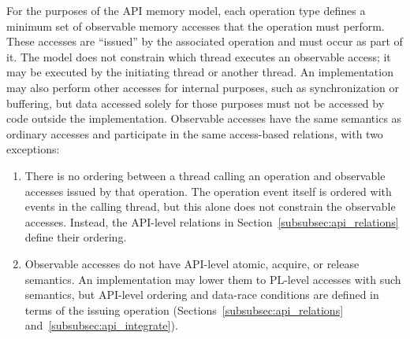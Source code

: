 For the purposes of the API memory model, each \openshmem operation type defines a
    minimum set of observable memory accesses that the operation must perform. These
    accesses are ``issued'' by the associated operation and must occur as part of it.
    The model does not constrain which thread executes an observable access; it may be
    executed by the initiating thread or another thread. An implementation may also
    perform other accesses for internal purposes, such as synchronization or buffering,
    but data accessed solely for those purposes must not be accessed by code outside the
    implementation.
Observable accesses have the same semantics as ordinary accesses and participate in the
    same access-based relations, with two exceptions:
\begin{enumerate}
  \item There is no \relSB{} ordering between a thread calling an \openshmem operation
      and observable accesses issued by that operation. The operation event itself is
      \relSB{} ordered with events in the calling thread, but this alone does not
      constrain the observable accesses. Instead, the API-level relations in
      Section~\ref{subsubsec:api_relations} define their ordering.
  \item Observable accesses do not have API-level atomic, acquire, or release semantics.
      An implementation may lower them to PL-level accesses with such semantics, but
      API-level ordering and data-race conditions are defined in terms of the issuing
      operation (Sections~\ref{subsubsec:api_relations}
      and~\ref{subsubsec:api_integrate}).
\end{enumerate}


